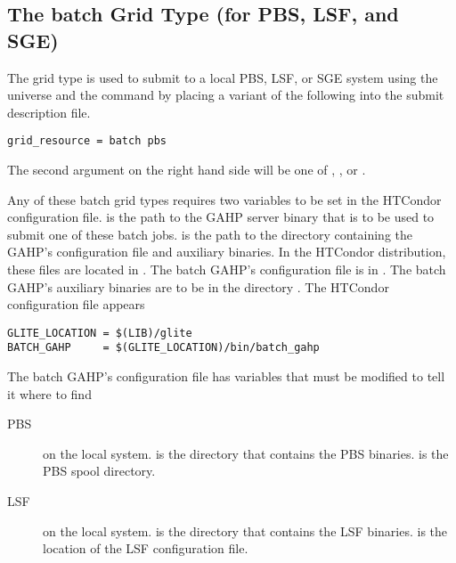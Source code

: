 \subsection{\label{sec:batch}The batch Grid Type (for PBS, LSF, and SGE) }
\label{sec:PBS}
\label{sec:LSF}
\label{sec:SGE}

The  grid type is used to submit to a local PBS, LSF, or SGE
system using the  universe and the
 command by placing a variant of the following
into the submit description file.
\begin{verbatim}
grid_resource = batch pbs
\end{verbatim}

The second argument on the right hand side will be one of
, , or .

Any of these batch grid types requires two variables to be set in the HTCondor
configuration file.
 is the path to the GAHP server binary that is to be
used to submit one of these batch jobs.
 is the path to the directory containing the GAHP's
configuration file and auxiliary binaries.
In the HTCondor distribution, these files are located in 
.
The batch GAHP's configuration file is in
.
The batch GAHP's auxiliary binaries
are to be in the directory .
The HTCondor configuration file appears

\footnotesize
\begin{verbatim}
GLITE_LOCATION = $(LIB)/glite
BATCH_GAHP     = $(GLITE_LOCATION)/bin/batch_gahp
\end{verbatim}
\normalsize

The batch GAHP's configuration file has variables that must be
modified to tell it where to find 
\begin{description}
\item[PBS] on the local system.
   is the directory that contains the PBS binaries.
   is the PBS spool directory.
\item[LSF] on the local system.
   is the directory that contains the LSF binaries.
   is the location of the LSF configuration file.
\end{description}

